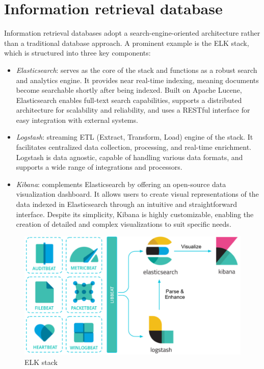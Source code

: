 \section{Information retrieval database}

Information retrieval databases adopt a search-engine-oriented architecture rather than a traditional database approach.
A prominent example is the ELK stack, which is structured into three key components:
\begin{itemize}
    \item \textit{Elasticsearch}: serves as the core of the stack and functions as a robust search and analytics engine. 
        It provides near real-time indexing, meaning documents become searchable shortly after being indexed. 
        Built on Apache Lucene, Elasticsearch enables full-text search capabilities, supports a distributed architecture for scalability and reliability, and uses a RESTful interface for easy integration with external systems.
    \item \textit{Logstash}: streaming ETL (Extract, Transform, Load) engine of the stack. 
        It facilitates centralized data collection, processing, and real-time enrichment. 
        Logstash is data agnostic, capable of handling various data formats, and supports a wide range of integrations and processors. 
    \item \textit{Kibana}: complements Elasticsearch by offering an open-source data visualization dashboard. 
        It allows users to create visual representations of the data indexed in Elasticsearch through an intuitive and straightforward interface. 
        Despite its simplicity, Kibana is highly customizable, enabling the creation of detailed and complex visualizations to suit specific needs.
\end{itemize}
\begin{figure}[H]
    \centering
    \includegraphics[width=0.75\linewidth]{images/elk.png}
    \caption{ELK stack}
\end{figure}

